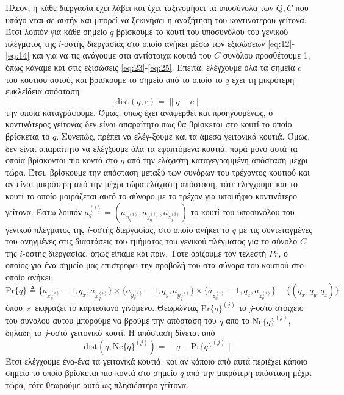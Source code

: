 \documentclass[11pt,a4paper,titlepage]{article}
\begin{document}
 	Πλέον, η κάθε διεργασία έχει λάβει και έχει ταξινομήσει τα υποσύνολα των $Q, C$ που υπάγο-νται σε αυτήν και μπορεί να ξεκινήσει η αναζήτηση του κοντινότερου γείτονα. Έτσι λοιπόν για κάθε σημείο $q$ βρίσκουμε το κουτί του υποσυνόλου του γενικού πλέγματος της $i$-οστής διεργασίας στο οποίο ανήκει μέσω των εξισώσεων \eqref{eq:12}-\eqref{eq:14} και για να τις ανάγουμε στα αντίστοιχα κουτιά του $C$ συνόλου προσθέτουμε 1, όπως κάναμε και στις εξισώσεις \eqref{eq:23}-\eqref{eq:25}. Έπειτα, ελέγχουμε όλα τα σημεία $c$ του κουτιού αυτού, και βρίσκουμε το σημείο από το οποίο το $q$ έχει τη μικρότερη ευκλείδεια απόσταση 
 	\begin{equation}
		\mathrm{dist} \left(q, c\right) = \|q - c\|
	\end{equation}
 	την οποία καταγράφουμε. Όμως, όπως έχει αναφερθεί και προηγουμένως, ο κοντινότερος γείτονας δεν είναι απαραίτητο πως θα βρίσκεται στο κουτί το οποίο βρίσκεται το $q$. Συνεπώς, πρέπει να ελέγ-ξουμε και τα άμεσα γειτονικά κουτιά. Όμως, δεν είναι απαραίτητο να ελέγξουμε όλα τα εφαπτόμενα κουτιά, παρά μόνο αυτά τα οποία βρίσκονται πιο κοντά στο $q$ από την ελάχιστη καταγεγραμμένη απόσταση μέχρι τώρα. Έτσι, βρίσκουμε την απόσταση μεταξύ των συνόρων του τρέχοντος κουτιού και αν είναι μικρότερη από την μέχρι τώρα ελάχιστη απόσταση, τότε ελέγχουμε και το κουτί το οποίο μοιράζεται αυτό το σύνορο με το τρέχον για υποψήφιο κοντινότερο γείτονα. Έστω λοιπόν $a_q^{(i)} = (a_{x_g^{(i)}}, a_{y_g^{(i)}}, a_{z_g^{(i)}})$ το κουτί του υποσυνόλου του γενικού πλέγματος της $i$-οστής διεργασίας, στο οποίο ανήκει το $q$ με τις συντεταγμένες του ανηγμένες στις διαστάσεις του τμήματος του γενικού πλέγματος για το σύνολο $C$ της $i$-οστής διεργασίας, όπως είπαμε και πριν. Τότε ορίζουμε τον τελεστή $Pr{}$, ο οποίος για ένα σημείο μας επιστρέφει την προβολή του στα σύνορα του κουτιού στο οποίο ανήκει:
 	\begin{equation}
	 	\mathrm{Pr} \{q\} \triangleq \{a_{x_g^{(i)}} -1, q_x, a_{x_g^{(i)}}\} \times \{a_{y_g^{(i)}} -1, q_y, a_{y_g^{(i)}}\} \times \{a_{z_g^{(i)}} -1, q_z, a_{z_g^{(i)}}\} -\{(q_x, q_y, q_z)\}
 	\end{equation}
 	όπου $\times$ εκφράζει το καρτεσιανό γινόμενο. Θεωρώντας $\mathrm{Pr} \{q\}^{(j)}$ το $j$-οστό στοιχείο του συνόλου αυτού μπορούμε να βρούμε την απόσταση του $q$ από το $\mathrm{Ne} \{q\}^{(j)}$, δηλαδή το $j$-οστό γειτονικό κουτί. Η απόσταση δίνεται από
 	\begin{equation}
		\mathrm{dist} \left(q, \mathrm{Ne} \{q\}^{(j)}\right) = \|q - \mathrm{Pr} \{q\}^{(j)}\|
 	\end{equation}
 	Έτσι ελέγχουμε ένα-ένα τα γειτονικά κουτιά, και αν κάποιο από αυτά περιέχει κάποιο σημείο το οποίο βρίσκεται πιο κοντά στο σημείο $q$ από την μικρότερη απόσταση μέχρι τώρα, τότε θεωρούμε αυτό ως πλησιέστερο γείτονα.\\
 	
\end{document}
